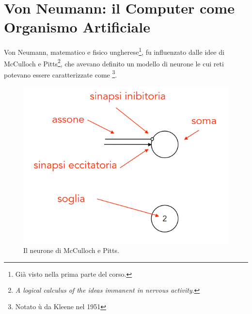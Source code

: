 
\section{Von Neumann: il Computer come Organismo Artificiale}

Von Neumann, matematico e fisico ungherese\footnote{Già visto
nella prima parte del corso.}, fu influenzato dalle idee di
McCulloch e Pitts\footnote{
    \textit{A logical calculus of the ideas immanent in nervous activity}.
}, che avevano definito un modello di neurone
le cui reti potevano essere caratterizzate come \footnote{Notato ù
da Kleene nel 1951}.

\begin{figure}[h]
    \centering
    \includegraphics[scale = 0.5]{images/McCulloch-Pitts.png}
    \caption{Il neurone di McCulloch e Pitts.}
\end{figure}

